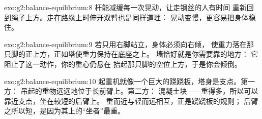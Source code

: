 \begin{solution}{exo:g2:balance-equilibrium:8}
杆能减缓每一次晃动，让走钢丝的人有时间
重新回到绳子上方。走在路缘上时伸开双臂也是同样道理：
晃动变慢，更容易把身体稳住。
\end{solution}

\begin{solution}{exo:g2:balance-equilibrium:9}
若只用右脚站立，身体必须向右倾，
使重力落在那只脚的正上方，正如塔使重力保持在底座之上。
墙恰好就是你需要靠的地方：
它阻止了这一动作，你的重心仍悬在
抬起那只脚的空位上方，于是你会倾倒。
\end{solution}

\begin{solution}{exo:g2:balance-equilibrium:10}
起重机就像一个巨大的跷跷板，塔身是支点。第一方：
吊起的重物远远地位于长前臂上。第二方：
混凝土块——重得多，所以可以靠近支点，坐在较短的后臂上。
重而近与轻而远相互，正是跷跷板的规则；
后臂之所以短，是因为其上的“坐者”最重。
\end{solution}
